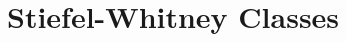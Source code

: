 \documentclass[../main]{subfiles}
\begin{document}
\setcounter{chapter}{3}
\chapter{Stiefel-Whitney Classes}\label{ch:4}






\end{document}
